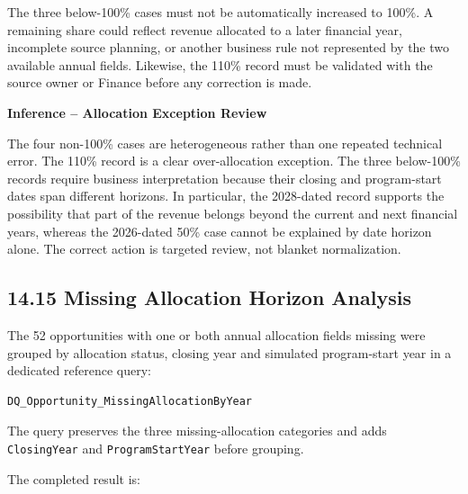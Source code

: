 \documentclass[11pt,a4paper]{article}
\begin{document}
\begin{warningbox}

The three below-100\% cases must not be automatically increased to 100\%.
A remaining share could reflect revenue allocated to a later financial year,
incomplete source planning, or another business rule not represented by the two
available annual fields. Likewise, the 110\% record must be validated with the
source owner or Finance before any correction is made.

\end{warningbox}

\begin{inferencebox}

\textbf{Inference -- Allocation Exception Review}

The four non-100\% cases are heterogeneous rather than one repeated technical
error. The 110\% record is a clear over-allocation exception. The three
below-100\% records require business interpretation because their closing and
program-start dates span different horizons. In particular, the 2028-dated
record supports the possibility that part of the revenue belongs beyond the
current and next financial years, whereas the 2026-dated 50\% case cannot be
explained by date horizon alone. The correct action is targeted review, not
blanket normalization.

\end{inferencebox}

\subsection{14.15 Missing Allocation Horizon Analysis}

The 52 opportunities with one or both annual allocation fields missing were
grouped by allocation status, closing year and simulated program-start year in
a dedicated reference query:

\begin{lstlisting}[style=powerquery]
DQ_Opportunity_MissingAllocationByYear
\end{lstlisting}

The query preserves the three missing-allocation categories and adds
\texttt{ClosingYear} and \texttt{ProgramStartYear} before grouping.

The completed result is:
\end{document}
